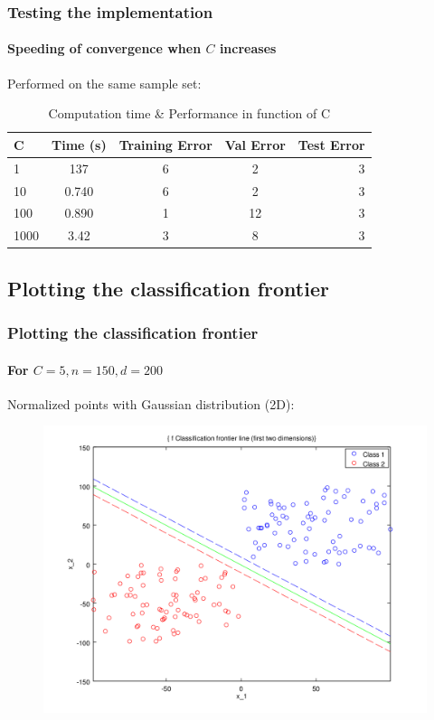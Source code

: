 \documentclass{beamer}
\begin{document}
\begin{frame}
\frametitle{Testing the implementation}
\framesubtitle{Speeding of convergence when $C$ increases}

Performed on the same sample set:\\

                \begin{table}
                \centering
                \caption{Computation time \& Performance in function of C}
                \begin{tabular}{| l | c | c | c | r |}
                \hline
               C  & Time (s) & Training Error & Val Error & Test Error\\ \hline
              
               1  & 137 & 6 & 2 & 3\\ \hline
               10  & 0.740 & 6 & 2 & 3  \\ \hline
               100 & 0.890 & 1 & 12 & 3\\ \hline
               1000 & 3.42 & 3 & 8 & 3\\ \hline
                \end{tabular}
                \end{table}

\end{frame}

\subsection{Plotting the classification frontier}

\begin{frame}
\tableofcontents[currentsubsection]
\end{frame}

\begin{frame}
\frametitle{Plotting the \textbf{classification frontier}}
\framesubtitle{For $C = 5, n = 150, d = 200$}

Normalized points with Gaussian distribution (2D):

         \begin{figure}
         \centering
         \includegraphics[scale=0.4]{images/line4.png}
         \end{figure}

\end{frame}
\end{document}
